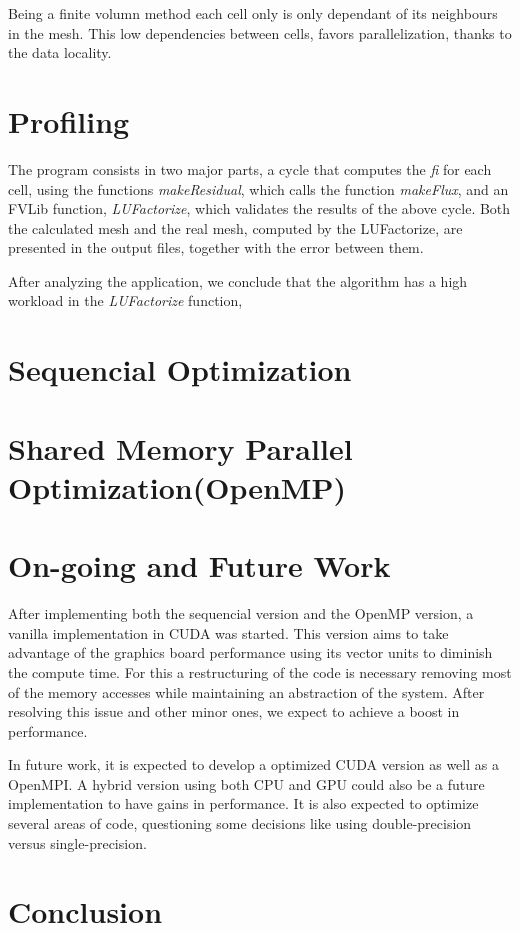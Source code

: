 \documentclass[a4paper,10pt,openright,openbib,twocolumn]{article}
\begin{document}
Being a finite volumn method each cell only is only dependant of its neighbours in the mesh. This low dependencies between cells, favors parallelization, thanks to the data locality.

\section{Profiling}

The program consists in two major parts, a cycle that computes the \emph{fi} for each cell, using the functions \emph{makeResidual}, which calls the function \emph{makeFlux}, and an FVLib function, \emph{LUFactorize}, which validates the results of the above cycle. Both the calculated mesh and the real mesh, computed by the LUFactorize, are presented in the output files, together with the error between them.
 
After analyzing the application, we conclude that the algorithm has a high workload in the \emph{LUFactorize} function,


\section{Sequencial Optimization}


\section{Shared Memory Parallel Optimization(OpenMP)}


\section{On-going and Future Work}

After implementing both the sequencial version and the OpenMP version, a vanilla implementation in CUDA was started. This version aims to take advantage of the graphics board performance using its vector units to diminish the compute time. For this a restructuring of the code is necessary removing most of the memory accesses while maintaining an abstraction of the system. After resolving this issue and other minor ones, we expect to achieve a boost in performance.

In future work, it is expected to develop a optimized CUDA version as well as a OpenMPI. A hybrid version using both CPU and GPU could also be a future implementation to have gains in performance. It is also expected to optimize several areas of code, questioning some decisions like using double-precision versus single-precision. 

\section{Conclusion}

\end{document}
